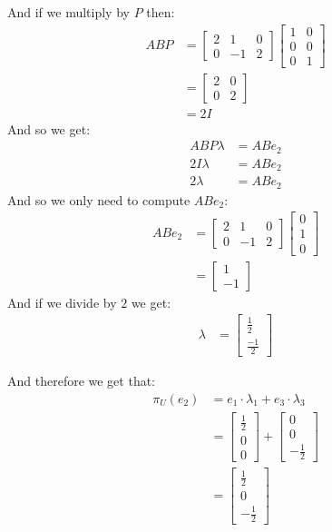 \documentclass[final,expand]{problemset}
\begin{document}
{	And if we multiply by $P$ then:
	\begin{align*}
		ABP &= \begin{bmatrix}
			2 & 1 & 0\\
			0 & -1 & 2
		\end{bmatrix} \begin{bmatrix}
			1 & 0\\ 0 & 0\\ 0 & 1
		\end{bmatrix}\\
		&= \begin{bmatrix}
			2 & 0\\
			0 & 2
		\end{bmatrix}\\
		&= 2I
	\end{align*}
	And so we get:
	\begin{align*}
		ABP\lambda &= ABe_2\\
		2I\lambda &= ABe_2\\
		2\lambda &= ABe_2
	\end{align*}
	And so we only need to compute $ABe_2$:
	\begin{align*}
		ABe_2 &= \begin{bmatrix}
			2 & 1 & 0\\
			0 & -1 & 2
		\end{bmatrix} \begin{bmatrix}
			0 \\ 1 \\ 0
		\end{bmatrix}\\
		&= \begin{bmatrix}
			1 \\ -1
		\end{bmatrix}
	\end{align*}
	And if we divide by $2$ we get:
	\begin{align*}
		\lambda &= \begin{bmatrix}
			\frac{1}{2} \\ \frac{-1}{2}
		\end{bmatrix}
	\end{align*}

	And therefore we get that:
	\begin{align*}
		\pi_U(e_2) &= e_1 \cdot \lambda_1 + e_3 \cdot \lambda_3\\
		&= \begin{bmatrix}
			\frac{1}{2} \\ 0 \\ 0
		\end{bmatrix} + \begin{bmatrix}
			0 \\ 0 \\ -\frac{1}{2}
		\end{bmatrix}\\
		&= \begin{bmatrix}
			\frac{1}{2} \\ 0\\ -\frac{1}{2}
		\end{bmatrix}
	\end{align*}

}
\end{document}
